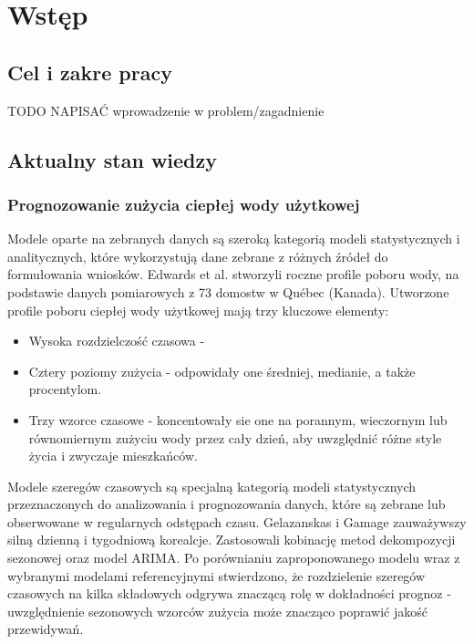 \documentclass[a4paper,twoside,12pt]{book}
\newcounter{stronyPozaNumeracja}
\begin{document}
\setcounter{stronyPozaNumeracja}{\value{page}}
\mainmatter
\pagestyle{empty}

\cleardoublepage

\pagestyle{NumeryStronNazwyRozdzialow}



\chapter{Wstęp}
\label{ch:wstep}
\section{Cel i zakre pracy}
TODO NAPISAĆ wprowadzenie w problem/zagadnienie
\newpage
\section{Aktualny stan wiedzy}

\subsection{Prognozowanie zużycia ciepłej wody użytkowej}
Modele oparte na zebranych danych są szeroką kategorią modeli statystycznych i analitycznych, które wykorzystują dane zebrane z różnych źródeł do formułowania wniosków. Edwards et al.\cite{bib:data_model} stworzyli roczne profile poboru wody, na podstawie danych pomiarowych z 73 domostw w Québec (Kanada). Utworzone profile poboru ciepłej wody użytkowej mają trzy kluczowe elementy:
\begin{itemize}
  \item Wysoka rozdzielczość czasowa -
  \item Cztery poziomy zużycia - odpowidały one średniej, medianie, a także procentylom.
  \item Trzy wzorce czasowe - koncentowały sie one na porannym, wieczornym lub równomiernym zużyciu wody przez cały dzień, aby uwzględnić różne style życia i zwyczaje mieszkańców.
\end{itemize}

Modele szeregów czasowych są specjalną kategorią modeli statystycznych przeznaczonych do analizowania i prognozowania danych, które są zebrane lub obserwowane w regularnych odstępach czasu. Gelazanskas i Gamage\cite{bib:Time_series} zauważywszy silną dzienną i tygodniową korealcje. Zastosowali kobinację metod dekompozycji sezonowej oraz model ARIMA. Po porównianiu zaproponowanego modelu wraz z wybranymi modelami referencyjnymi stwierdzono, że rozdzielenie szeregów czasowych na kilka składowych odgrywa znaczącą rolę w dokładności prognoz - uwzględnienie sezonowych wzorców zużycia może znacząco poprawić jakość przewidywań.\\
\end{document}
